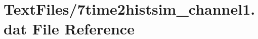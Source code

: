 \hypertarget{7time2histsim__channel1_8dat}{}\section{Text\+Files/7time2histsim\+\_\+channel1.dat File Reference}
\label{7time2histsim__channel1_8dat}
